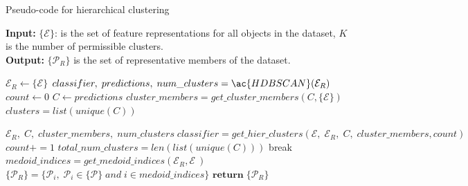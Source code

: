 \begin{algorithm}[H]
    \caption{Pseudo-code for hierarchical clustering}\label{alg:hier_cluster}
    \textbf{Input:} $\{\mathcal{E}\}$: is the set of feature representations for all objects in the dataset, $K$ is the number of permissible clusters.\\
    \textbf{Output:} $\{\mathcal{P}_R\}$ is the set of representative members of the dataset.
    \begin{algorithmic}[1] 
        \State $\mathcal{E}_R \leftarrow \{\mathcal{E}\}$               
        \State $classifier,\; predictions,\; num\_clusters = \ac{HDBSCAN}(\mathcal{E}_R)$
        \State $count \leftarrow 0$
        \State $C \leftarrow predictions$
        \State $cluster\_members = get\_cluster\_members(C, \{\mathcal{E}\})$
        \State $clusters = list(unique(C))$
        
            \State $\mathcal{E}_R, \; C, \; cluster\_members, \; num\_clusters \; classifier = get\_hier\_clusters(\mathcal{E}, \; \mathcal{E}_R, \; C, \; cluster\_members, count)$
            \State $count +=1$
            \State $total\_num\_clusters = len(list(unique(C)))$
                \State break
            \EndIf            
        \EndWhile
        \State $medoid\_indices = get\_medoid\_indices(\mathcal{E}_R, \mathcal{E}\ )$
        \State $\{\mathcal{P}_R\} = \{\mathcal{P}_i, \; \mathcal{P}_i \in \{\mathcal{P}\} \; and \; i \in medoid\_indices\}$
        \State $\mathbf{return \;}\{\mathcal{P}_R\}$          
    \end{algorithmic}
\end{algorithm}

